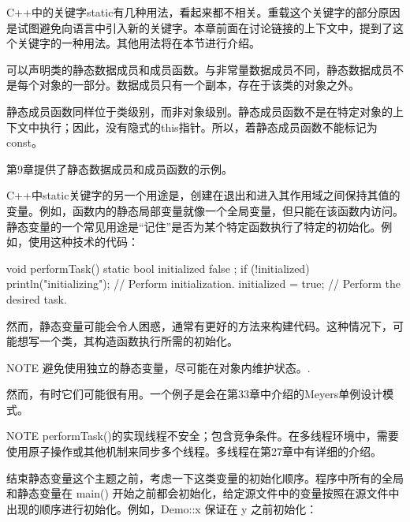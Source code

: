 
C++中的关键字static有几种用法，看起来都不相关。重载这个关键字的部分原因是试图避免向语言中引入新的关键字。本章前面在讨论链接的上下文中，提到了这个关键字的一种用法。其他用法将在本节进行介绍。


可以声明类的静态数据成员和成员函数。与非常量数据成员不同，静态数据成员不是每个对象的一部分。数据成员只有一个副本，存在于该类的对象之外。

静态成员函数同样位于类级别，而非对象级别。静态成员函数不是在特定对象的上下文中执行；因此，没有隐式的this指针。所以，着静态成员函数不能标记为const。

第9章提供了静态数据成员和成员函数的示例。


C++中static关键字的另一个用途是，创建在退出和进入其作用域之间保持其值的变量。例如，函数内的静态局部变量就像一个全局变量，但只能在该函数内访问。静态变量的一个常见用途是“记住”是否为某个特定函数执行了特定的初始化。例如，使用这种技术的代码：

\begin{cpp}
void performTask()
{
    static bool initialized { false };
    if (!initialized) {
        println("initializing");
        // Perform initialization.
        initialized = true;
    }
    // Perform the desired task.
}
\end{cpp}

然而，静态变量可能会令人困惑，通常有更好的方法来构建代码。这种情况下，可能想写一个类，其构造函数执行所需的初始化。

\begin{myNotic}{NOTE}
避免使用独立的静态变量，尽可能在对象内维护状态。.
\end{myNotic}

然而，有时它们可能很有用。一个例子是会在第33章中介绍的Meyers单例设计模式。

\begin{myNotic}{NOTE}
performTask()的实现线程不安全；包含竞争条件。在多线程环境中，需要使用原子操作或其他机制来同步多个线程。多线程在第27章中有详细的介绍。
\end{myNotic}


结束静态变量这个主题之前，考虑一下这类变量的初始化顺序。程序中所有的全局和静态变量在 main() 开始之前都会初始化，给定源文件中的变量按照在源文件中出现的顺序进行初始化。例如，Demo::x 保证在 y 之前初始化：

